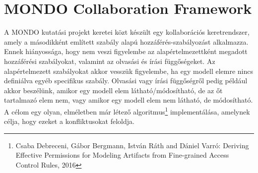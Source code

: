 \clearpage
\section{MONDO Collaboration Framework}
A MONDO kutatási projekt keretei közt készült egy kollaborációs keretrendszer, amely a másodikként említett szabály alapú hozzáférés-szabályozást alkalmazza. Ennek hiányossága, hogy nem veszi figyelembe az alapértelmezettként megadott hozzáférési szabályokat, valamint az olvasási és írási függőségeket. Az alapértelmezett szabályokat akkor vesszük figyelembe, ha egy modell elemre nincs definiálva egyéb specifikus szabály. Olvasási vagy írási függőségről pedig például akkor beszélünk, amikor egy modell elem látható/módosítható, de az őt tartalmazó elem nem, vagy amikor egy modell elem nem látható, de módosítható. A célom egy olyan, elméletben már létező algoritmus\footnote{Csaba Debreceni, Gábor Bergmann, István Ráth and Dániel Varró: Deriving Effective Permissions for Modeling Artifacts from Fine-grained Access Control Rules, 2016} implementálása, amelynek célja, hogy ezeket a konfliktusokat feloldja.
